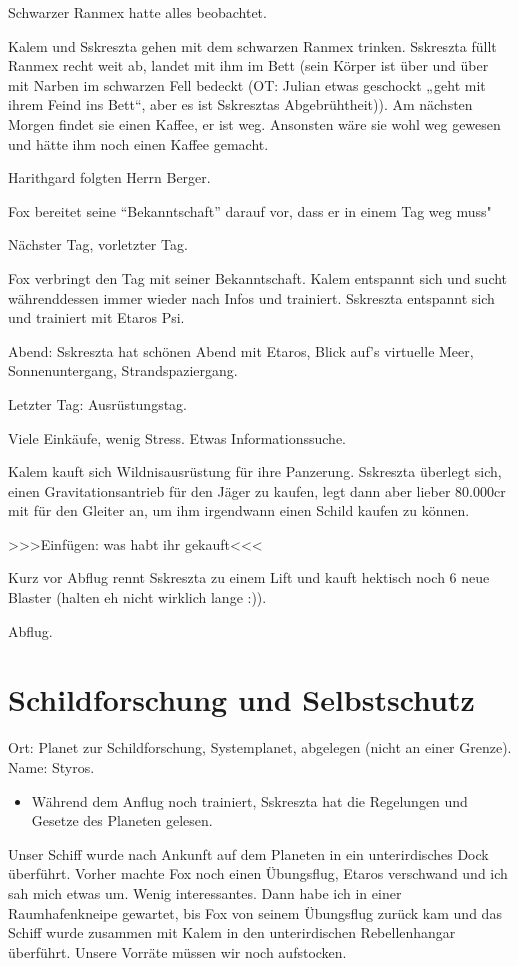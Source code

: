 \documentclass[11pt]{article}
\begin{document}
Schwarzer Ranmex hatte alles beobachtet.

Kalem und Sskreszta gehen mit dem schwarzen Ranmex trinken. Sskreszta
füllt Ranmex recht weit ab, landet mit ihm im Bett (sein Körper ist über
und über mit Narben im schwarzen Fell bedeckt (OT: Julian etwas
geschockt „geht mit ihrem Feind ins Bett``, aber es ist Sskresztas
Abgebrühtheit)). Am nächsten Morgen findet sie einen Kaffee, er ist weg.
Ansonsten wäre sie wohl weg gewesen und hätte ihm noch einen Kaffee
gemacht.

Harithgard folgten Herrn Berger.

Fox bereitet seine ``Bekanntschaft'' darauf vor, dass er in einem Tag
weg muss"

Nächster Tag, vorletzter Tag.

Fox verbringt den Tag mit seiner Bekanntschaft. Kalem entspannt sich und
sucht währenddessen immer wieder nach Infos und trainiert. Sskreszta
entspannt sich und trainiert mit Etaros Psi.

Abend: Sskreszta hat schönen Abend mit Etaros, Blick auf's virtuelle
Meer, Sonnenuntergang, Strandspaziergang.

Letzter Tag: Ausrüstungstag.

Viele Einkäufe, wenig Stress. Etwas Informationssuche.

Kalem kauft sich Wildnisausrüstung für ihre Panzerung. Sskreszta
überlegt sich, einen Gravitationsantrieb für den Jäger zu kaufen, legt
dann aber lieber 80.000cr mit für den Gleiter an, um ihm irgendwann
einen Schild kaufen zu können.

\textgreater{}\textgreater{}\textgreater{}Einfügen: was habt ihr
gekauft\textless{}\textless{}\textless{}

Kurz vor Abflug rennt Sskreszta zu einem Lift und kauft hektisch noch 6
neue Blaster (halten eh nicht wirklich lange :)).

Abflug.

\section{Schildforschung und Selbstschutz}

Ort: Planet zur Schildforschung, Systemplanet, abgelegen (nicht an einer
Grenze). Name: Styros.

\begin{itemize}
\item
  Während dem Anflug noch trainiert, Sskreszta hat die Regelungen und
  Gesetze des Planeten gelesen.
\end{itemize}
Unser Schiff wurde nach Ankunft auf dem Planeten in ein unterirdisches
Dock überführt. Vorher machte Fox noch einen Übungsflug, Etaros
verschwand und ich sah mich etwas um. Wenig interessantes. Dann habe ich
in einer Raumhafenkneipe gewartet, bis Fox von seinem Übungsflug zurück
kam und das Schiff wurde zusammen mit Kalem in den unterirdischen
Rebellenhangar überführt. Unsere Vorräte müssen wir noch aufstocken.
\end{document}

